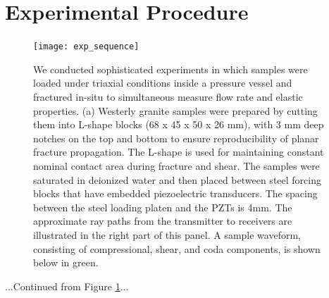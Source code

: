 \documentclass[letterpaper,10pt]{article}
\begin{document}
\newpage


\section{Experimental Procedure}

\begin{figure}[ht]
	\centering
	\texttt{[image: exp\_sequence]}
	\caption[]{We conducted sophisticated experiments in which samples were loaded under triaxial conditions inside a pressure vessel and fractured in-situ to simultaneous measure flow rate and elastic properties. (a) Westerly granite samples were prepared by cutting them into L-shape blocks (68 x 45 x 50 x 26 mm), with 3 mm deep notches on the top and bottom to ensure reproducibility of planar fracture propagation. The L-shape is used for maintaining constant nominal contact area during fracture and shear. The samples were saturated in deionized water and then placed between steel forcing blocks that have embedded piezoelectric transducers. The spacing between the steel loading platen and the PZTs is 4mm. The approximate ray paths from the transmitter to receivers are illustrated in the right part of this panel. A sample waveform, consisting of compressional, shear, and coda components, is shown below in green.
	}
	\label{fig:exp_seq}
\end{figure}

\newpage

...Continued from Figure \ref{fig:exp_seq}...
\end{document}

